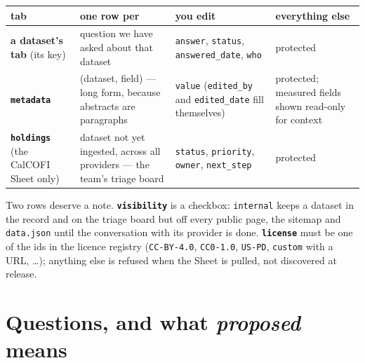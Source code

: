 \documentclass[
  letterpaper,
  DIV=11,
  numbers=noendperiod]{scrreprt}
\begin{document}
\begin{longtable}[]{@{}
  >{\raggedright\arraybackslash}p{}
  >{\raggedright\arraybackslash}p{}
  >{\raggedright\arraybackslash}p{}
  >{\raggedright\arraybackslash}p{}@{}}
\toprule\noalign{}
\begin{minipage}[b]{\linewidth}\raggedright
tab
\end{minipage} & \begin{minipage}[b]{\linewidth}\raggedright
one row per
\end{minipage} & \begin{minipage}[b]{\linewidth}\raggedright
you edit
\end{minipage} & \begin{minipage}[b]{\linewidth}\raggedright
everything else
\end{minipage} \\
\midrule\noalign{}
\endhead
\bottomrule\noalign{}
\endlastfoot
\textbf{a dataset's tab} (its key) & question we have asked about that
dataset & \texttt{answer}, \texttt{status}, \texttt{answered\_date},
\texttt{who} & protected \\
\textbf{\texttt{metadata}} & (dataset, field) --- long form, because
abstracts are paragraphs & \texttt{value} (\texttt{edited\_by} and
\texttt{edited\_date} fill themselves) & protected; measured fields
shown read-only for context \\
\textbf{\texttt{holdings}} (the CalCOFI Sheet only) & dataset not yet
ingested, across all providers --- the team's triage board &
\texttt{status}, \texttt{priority}, \texttt{owner}, \texttt{next\_step}
& protected \\
\end{longtable}

Two rows deserve a note. \textbf{\texttt{visibility}} is a checkbox:
\texttt{internal} keeps a dataset in the record and on the triage board
but off every public page, the sitemap and \texttt{data.json} until the
conversation with its provider is done. \textbf{\texttt{license}} must
be one of the ids in the licence registry (\texttt{CC-BY-4.0},
\texttt{CC0-1.0}, \texttt{US-PD}, \texttt{custom} with a URL, \ldots);
anything else is refused when the Sheet is pulled, not discovered at
release.

\section{\texorpdfstring{Questions, and what \emph{proposed}
means}{Questions, and what proposed means}}\label{questions-and-what-proposed-means}
\end{document}

